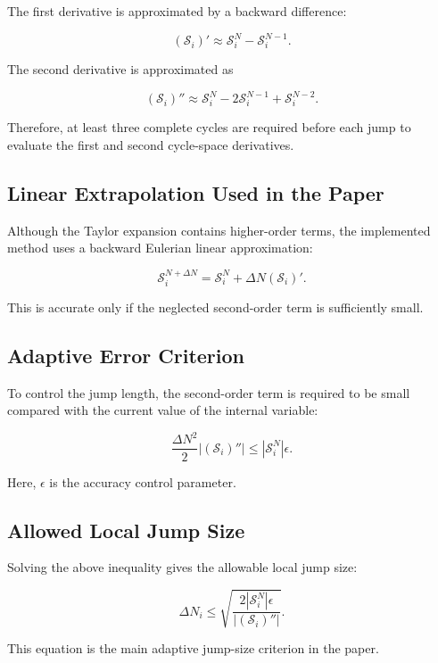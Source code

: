 ﻿\documentclass[11pt,a4paper]{article}
\begin{document}
The first derivative is approximated by a backward difference:

\[
\left(
\bm{\mathcal{S}}_i
\right)'
\approx
\bm{\mathcal{S}}_i^N
-
\bm{\mathcal{S}}_i^{N-1}.
\]

The second derivative is approximated as

\[
\left(
\bm{\mathcal{S}}_i
\right)''
\approx
\bm{\mathcal{S}}_i^N
-
2\bm{\mathcal{S}}_i^{N-1}
+
\bm{\mathcal{S}}_i^{N-2}.
\]

Therefore, at least three complete cycles are required before each jump to evaluate the first and second cycle-space derivatives.

\subsection{Linear Extrapolation Used in the Paper}

Although the Taylor expansion contains higher-order terms, the implemented method uses a backward Eulerian linear approximation:

\[
\bm{\mathcal{S}}_i^{N+\Delta N}
=
\bm{\mathcal{S}}_i^N
+
\Delta N
\left(
\bm{\mathcal{S}}_i
\right)'.
\]

This is accurate only if the neglected second-order term is sufficiently small.

\subsection{Adaptive Error Criterion}

To control the jump length, the second-order term is required to be small compared with the current value of the internal variable:

\[
\frac{\Delta N^2}{2}
\left|
\left(
\bm{\mathcal{S}}_i
\right)''
\right|
\leq
\left|
\bm{\mathcal{S}}_i^N
\right|
\epsilon.
\]

Here, $\epsilon$ is the accuracy control parameter.

\subsection{Allowed Local Jump Size}

Solving the above inequality gives the allowable local jump size:

\[
\Delta N_i
\leq
\sqrt{
\frac{
2
\left|
\bm{\mathcal{S}}_i^N
\right|
\epsilon
}{
\left|
\left(
\bm{\mathcal{S}}_i
\right)''
\right|
}
}.
\]

This equation is the main adaptive jump-size criterion in the paper.
\end{document}
